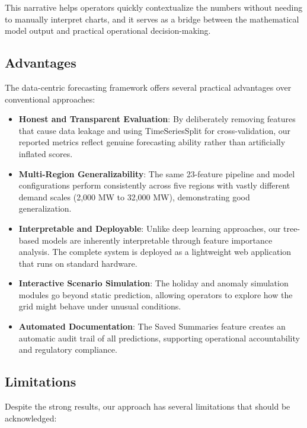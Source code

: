 \documentclass[conference]{IEEEtran}
\begin{document}
This narrative helps operators quickly contextualize the numbers without needing to manually interpret charts, and it serves as a bridge between the mathematical model output and practical operational decision-making.

\subsection{Advantages}

The data-centric forecasting framework offers several practical advantages over conventional approaches:

\begin{itemize}
    \item \textbf{Honest and Transparent Evaluation}: By deliberately removing features that cause data leakage and using TimeSeriesSplit for cross-validation, our reported metrics reflect genuine forecasting ability rather than artificially inflated scores.
    \item \textbf{Multi-Region Generalizability}: The same 23-feature pipeline and model configurations perform consistently across five regions with vastly different demand scales (2,000 MW to 32,000 MW), demonstrating good generalization.
    \item \textbf{Interpretable and Deployable}: Unlike deep learning approaches, our tree-based models are inherently interpretable through feature importance analysis. The complete system is deployed as a lightweight web application that runs on standard hardware.
    \item \textbf{Interactive Scenario Simulation}: The holiday and anomaly simulation modules go beyond static prediction, allowing operators to explore how the grid might behave under unusual conditions.
    \item \textbf{Automated Documentation}: The Saved Summaries feature creates an automatic audit trail of all predictions, supporting operational accountability and regulatory compliance.
\end{itemize}

\subsection{Limitations}

Despite the strong results, our approach has several limitations that should be acknowledged:
\end{document}
